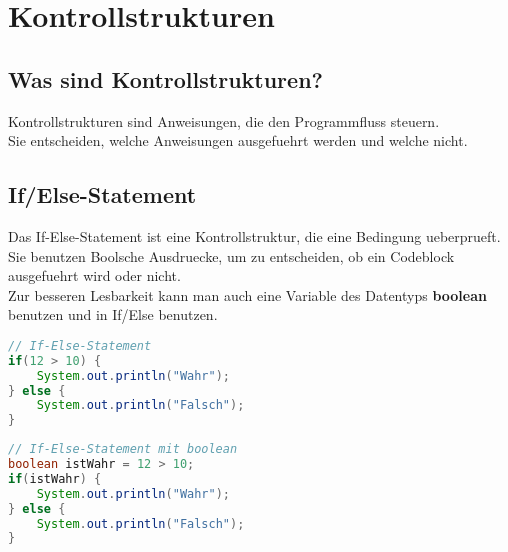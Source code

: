 \documentclass[12pt, a4paper]{article}
\begin{document}
\section{Kontrollstrukturen}
\subsection*{Was sind Kontrollstrukturen?}
Kontrollstrukturen sind Anweisungen, die den Programmfluss steuern.\\
Sie entscheiden, welche Anweisungen ausgefuehrt werden und welche nicht.
\subsection*{If/Else-Statement}
Das If-Else-Statement ist eine Kontrollstruktur, die eine Bedingung ueberprueft. \vspace{0.5cm} \\
Sie benutzen Boolsche Ausdruecke, um zu entscheiden, ob ein Codeblock ausgefuehrt wird oder nicht. \vspace{0.5cm} \\
Zur besseren Lesbarkeit kann man auch eine Variable des Datentyps \textbf{boolean} benutzen und in If/Else benutzen.
\begin{lstlisting}[language=java,title=Beispiel:If-/Else-Statement]
// If-Else-Statement
if(12 > 10) {
    System.out.println("Wahr");
} else {
    System.out.println("Falsch");
}
\end{lstlisting}
\begin{lstlisting}[language=java,title=Beispiel:If-/Else-Boolean]
// If-Else-Statement mit boolean
boolean istWahr = 12 > 10;
if(istWahr) {
    System.out.println("Wahr");
} else {
    System.out.println("Falsch");
}
\end{lstlisting}
\newpage
\end{document}
